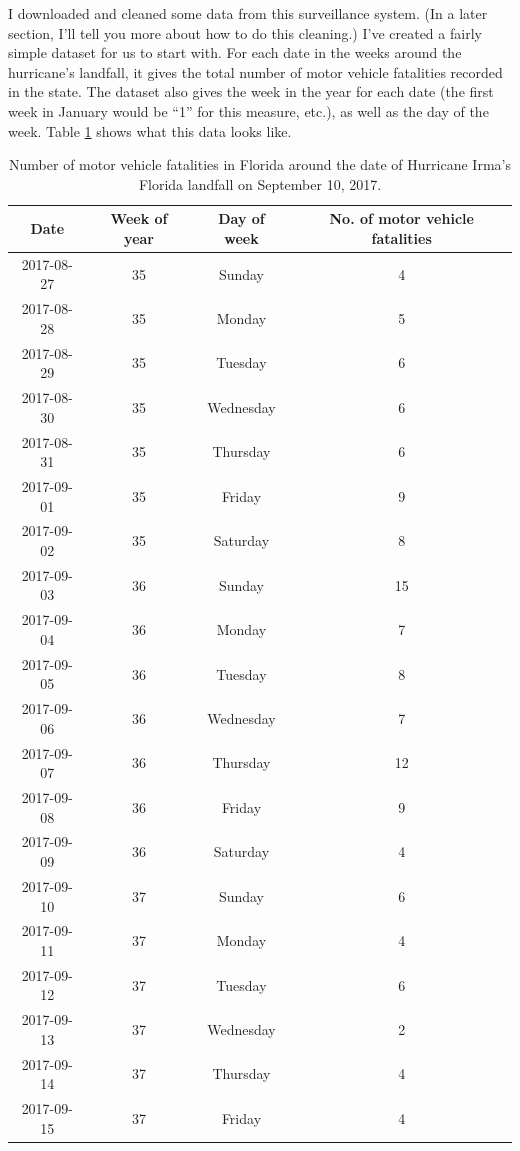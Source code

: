 \documentclass[]{tufte-book}
\begin{document}
I downloaded and cleaned some data from this surveillance system. (In a later section,
I'll tell you more about how to do this cleaning.) I've created a fairly
simple dataset for us to start with. For each date in the weeks around the hurricane's
landfall, it gives the total number of motor vehicle fatalities recorded in the
state. The dataset also gives the week in the year for each date (the first week in
January would be ``1'' for this measure, etc.), as well as the day of the week.
Table \ref{tab:exampledata} shows what this data looks like.

\begin{table}[t]

\caption{\label{tab:exampledata}Number of motor vehicle fatalities in Florida around the date of Hurricane Irma's Florida landfall on September 10, 2017.}
\centering
\begin{tabular}{c|c|c|c}
\hline
Date & Week of year & Day of week & No. of motor vehicle fatalities\\
\hline
2017-08-27 & 35 & Sunday & 4\\
\hline
2017-08-28 & 35 & Monday & 5\\
\hline
2017-08-29 & 35 & Tuesday & 6\\
\hline
2017-08-30 & 35 & Wednesday & 6\\
\hline
2017-08-31 & 35 & Thursday & 6\\
\hline
2017-09-01 & 35 & Friday & 9\\
\hline
2017-09-02 & 35 & Saturday & 8\\
\hline
2017-09-03 & 36 & Sunday & 15\\
\hline
2017-09-04 & 36 & Monday & 7\\
\hline
2017-09-05 & 36 & Tuesday & 8\\
\hline
2017-09-06 & 36 & Wednesday & 7\\
\hline
2017-09-07 & 36 & Thursday & 12\\
\hline
2017-09-08 & 36 & Friday & 9\\
\hline
2017-09-09 & 36 & Saturday & 4\\
\hline
2017-09-10 & 37 & Sunday & 6\\
\hline
2017-09-11 & 37 & Monday & 4\\
\hline
2017-09-12 & 37 & Tuesday & 6\\
\hline
2017-09-13 & 37 & Wednesday & 2\\
\hline
2017-09-14 & 37 & Thursday & 4\\
\hline
2017-09-15 & 37 & Friday & 4\\

\end{tabular}
\end{table}
\end{document}
